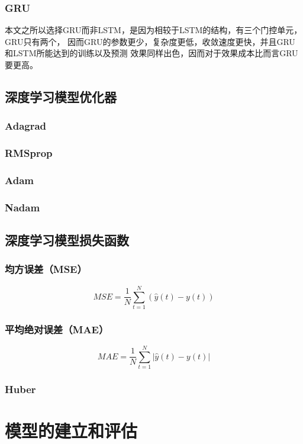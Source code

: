 \documentclass[AutoFakeBold]{LZUThesis}
\begin{document}
\subsection{GRU}
本文之所以选择GRU而非LSTM，是因为相较于LSTM的结构，有三个门控单元，GRU只有两个，
因而GRU的参数更少，复杂度更低，收敛速度更快，并且GRU和LSTM所能达到的训练以及预测
效果同样出色，因而对于效果成本比而言GRU要更高\cite{chung2014empirical}。

\section{深度学习模型优化器}
\subsection{Adagrad}

\subsection{RMSprop}

\subsection{Adam}

\subsection{Nadam}


\section{深度学习模型损失函数}
\subsection{均方误差（MSE）}
$$MSE=\frac{1}{N}\sum_{t=1}^{N}\left(\hat{y}\left(t\right)-y\left(t\right)\right)$$

\subsection{平均绝对误差（MAE）}
$$MAE=\frac{1}{N}\sum_{t=1}^{N}\left|\hat{y}\left(t\right)-y\left(t\right)\right|$$

\subsection{Huber}


\chapter{模型的建立和评估}
\end{document}
